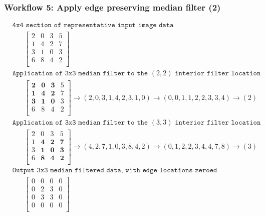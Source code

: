 \documentclass[19pt]{beamer}
\begin{document}
\begin{frame}
\frametitle{Workflow 5: Apply edge preserving median filter (2)}

\fontsize{8.5}{8.5}\selectfont

\vspace*{-10pt}
\begin{equation*}
\begin{aligned}
&\texttt{4x4 section of representative input image data}\\
& \hspace{20pt} \begin{bmatrix}
2 & 0 & 3 & 5 \\
1 & 4 & 2 & 7 \\
3 & 1 & 0 & 3 \\
6 & 8 & 4 & 2 \\ 
\end{bmatrix} \\[5pt]
%
& \texttt{Application of 3x3 median filter to the $(2,2)$ interior filter location}\\
& \hspace{20pt} \begin{bmatrix}
\mathbf{2} & \mathbf{0} & \mathbf{3} & 5 \\
\mathbf{1} & \mathbf{4} & \mathbf{2} & 7 \\
\mathbf{3} & \mathbf{1} & \mathbf{0} & 3 \\
6 & 8 & 4 & 2 \\ 
\end{bmatrix} 
\rightarrow (2, 0, 3, 1, 4, 2, 3, 1, 0) \rightarrow (0, 0, 1, 1, 2, 2, 3, 3, 4) \rightarrow (2) \\[5pt]
%
& \texttt{Application of 3x3 median filter to the $(3,3)$ interior filter location}\\
& \hspace{20pt} \begin{bmatrix}
2 & 0 & 3 & 5 \\
1 & \mathbf{4} & \mathbf{2} & \mathbf{7} \\
3 & \mathbf{1} & \mathbf{0} & \mathbf{3} \\
6 & \mathbf{8} & \mathbf{4} & \mathbf{2} \\ 
\end{bmatrix} 
\rightarrow (4, 2, 7, 1, 0, 3, 8, 4, 2) \rightarrow (0, 1, 2, 2, 3, 4, 4, 7, 8) \rightarrow (3) \\[5pt]
%
& \texttt{Output 3x3 median filtered data, with edge locations zeroed}\\
& \hspace{20pt} \begin{bmatrix}
0 & 0 & 0 & 0 \\
0 & 2 & 3 & 0 \\
0 & 3 & 3 & 0 \\
0 & 0 & 0 & 0 \\ 
\end{bmatrix}
\end{aligned}
\end{equation*}

\end{frame}
\end{document}
